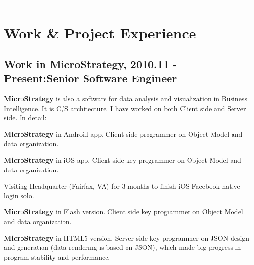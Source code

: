 \documentclass[letterpaper]{article}
\renewenvironment{itemize}{
  \begin{list}{}{
    \setlength{\leftmargin}{1.5em}
    \setlength{\itemsep}{0pt}
  }
}{
  \end{list}
}
\begin{document}

\rule{16.8cm}{0.1em}

\vspace{-1.5em}
\section*{Work \& Project Experience}
\subsection*{Work in MicroStrategy, 2010.11 - Present:\hfill Senior Software Engineer}
\begin{itemize}
\item \textbf{MicroStrategy} is also a software for data analysis and visualization in Business Intelligence. It is C/S architecture. I have worked on both Client side and Server side. In detail:
\item \textbf{MicroStrategy} in Android app. Client side programmer on Object Model and data organization.
\item \textbf{MicroStrategy} in iOS app. Client side key programmer on Object Model and data organization.
\item Visiting Headquarter (Fairfax, VA) for 3 months to finish iOS Facebook native login solo.
\item \textbf{MicroStrategy} in Flash version. Client side key programmer on Object Model and data organization.
\item \textbf{MicroStrategy} in HTML5 version. Server side key programmer on JSON design and generation (data rendering is based on JSON), which made big progress in program stability and performance.
\end{itemize}
\end{document}
